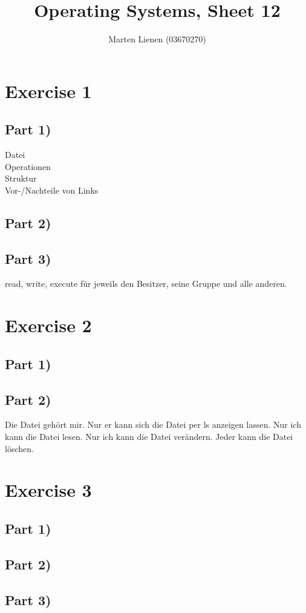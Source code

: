 \documentclass[10pt,a4paper]{article}
\title{Operating Systems, Sheet 12}
\author{Marten Lienen (03670270)}
\begin{document}
\maketitle

\section*{Exercise 1}

\subsection*{Part 1)}

\begin{description}
\item[Datei]
\item[Operationen]
\item[Struktur]
\item[Vor-/Nachteile von Links]
\end{description}

\subsection*{Part 2)}

\subsection*{Part 3)}

read, write, execute für jeweils den Besitzer, seine Gruppe und alle anderen.

\section*{Exercise 2}

\subsection*{Part 1)}

\subsection*{Part 2)}

Die Datei gehört mir.
Nur er kann sich die Datei per ls anzeigen lassen.
Nur ich kann die Datei lesen.
Nur ich kann die Datei verändern.
Jeder kann die Datei löschen.

\section*{Exercise 3}

\subsection*{Part 1)}

\subsection*{Part 2)}

\subsection*{Part 3)}
\end{document}
